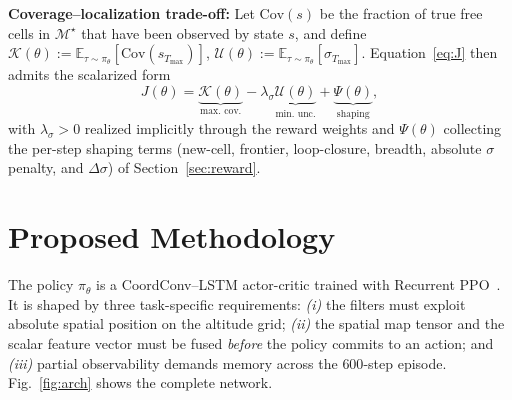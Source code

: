 \documentclass[conference]{IEEEtran}
\begin{document}
\noindent\textbf{Coverage--localization trade-off:} Let $\mathrm{Cov}(s)$ be the fraction of true free cells in $\mathcal{M}^{\star}$ that have been observed by state $s$, and define $\mathcal{K}(\theta)\!:=\!\mathbb{E}_{\tau\sim\pi_\theta}[\mathrm{Cov}(s_{T_{\max}})]$, $\mathcal{U}(\theta)\!:=\!\mathbb{E}_{\tau\sim\pi_\theta}[\sigma_{T_{\max}}]$. Equation~\eqref{eq:J} then admits the scalarized form
\begin{equation}
J(\theta) = \underbrace{\mathcal{K}(\theta)}_{\text{max.\ cov.}} - \lambda_\sigma\underbrace{\mathcal{U}(\theta)}_{\text{min.\ unc.}} + \underbrace{\Psi(\theta)}_{\text{shaping}},
\label{eq:multiobj}
\end{equation}
with $\lambda_\sigma\!>\!0$ realized implicitly through the reward weights and $\Psi(\theta)$ collecting the per-step shaping terms (new-cell, frontier, loop-closure, breadth, absolute $\sigma$ penalty, and $\Delta\sigma$) of Section~\ref{sec:reward}.

\section{Proposed Methodology}\label{sec:arch}

The policy $\pi_\theta$ is a CoordConv--LSTM actor-critic trained with Recurrent PPO~\cite{raffin2021sb3,ni2022recurrent}. It is shaped by three task-specific requirements: \emph{(i)} the filters must exploit absolute spatial position on the altitude grid; \emph{(ii)} the spatial map tensor and the scalar feature vector must be fused \emph{before} the policy commits to an action; and \emph{(iii)} partial observability demands memory across the $600$-step episode. Fig.~\ref{fig:arch} shows the complete network.
\end{document}
